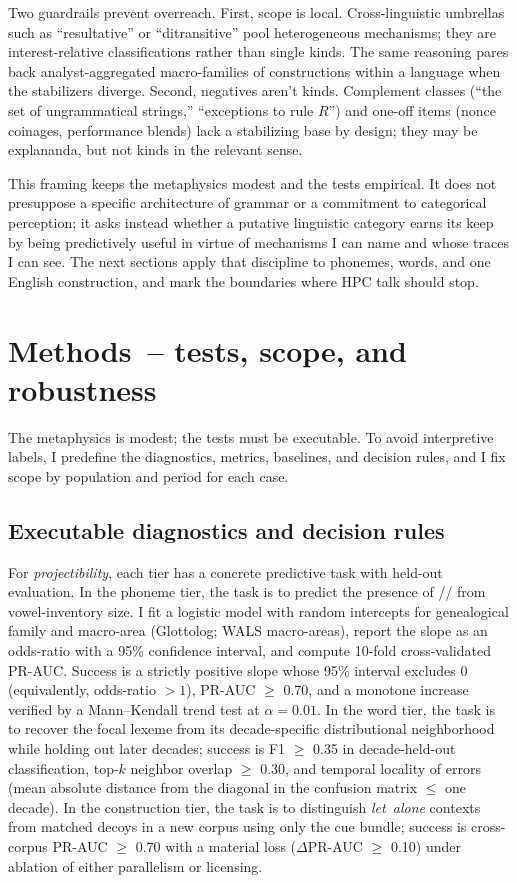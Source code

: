 \documentclass[12pt]{article}
\begin{document}
Two guardrails prevent overreach. First, scope is local. Cross-linguistic umbrellas such as “resultative” or “ditransitive” pool heterogeneous mechanisms; they are interest-relative classifications rather than single kinds. The same reasoning pares back analyst-aggregated macro-families of constructions within a language when the stabilizers diverge. Second, negatives aren't kinds. Complement classes (“the set of ungrammatical strings,” “exceptions to rule $R$”) and one-off items (nonce coinages, performance blends) lack a stabilizing base by design; they may be explananda, but not kinds in the relevant sense.

This framing keeps the metaphysics modest and the tests empirical. It does not presuppose a specific architecture of grammar or a commitment to categorical perception; it asks instead whether a putative linguistic category earns its keep by being predictively useful in virtue of mechanisms I can name and whose traces I can see. The next sections apply that discipline to phonemes, words, and one English construction, and mark the boundaries where \textsc{HPC} talk should stop.


\section{Methods~-- tests, scope, and robustness}\label{sec:methods}

The metaphysics is modest; the tests must be executable. To avoid interpretive labels, I predefine the diagnostics, metrics, baselines, and decision rules, and I fix scope by population and period for each case.

\subsection*{Executable diagnostics and decision rules}

For \emph{projectibility}, each tier has a concrete predictive task with held-out evaluation. In the phoneme tier, the task is to predict the presence of // from vowel-inventory size. I fit a logistic model with random intercepts for genealogical family and macro-area (Glottolog; WALS macro-areas), report the slope as an odds-ratio with a 95\% confidence interval, and compute 10-fold cross-validated PR-AUC. Success is a strictly positive slope whose 95\% interval excludes 0 (equivalently, odds-ratio $>1$), PR-AUC $\ge$ 0.70, and a monotone increase verified by a Mann–Kendall trend test at $\alpha=0.01$. In the word tier, the task is to recover the focal lexeme from its decade-specific distributional neighborhood while holding out later decades; success is F1 $\ge$ 0.35 in decade-held-out classification, top-$k$ neighbor overlap $\ge$ 0.30, and temporal locality of errors (mean absolute distance from the diagonal in the confusion matrix $\leq$ one decade). In the construction tier, the task is to distinguish \emph{let~alone} contexts from matched decoys in a new corpus using only the cue bundle; success is cross-corpus PR-AUC $\ge$ 0.70 with a material loss ($\Delta$PR-AUC $\ge$ 0.10) under ablation of either parallelism or licensing.
\end{document}
